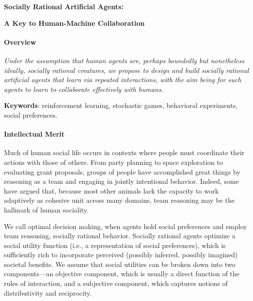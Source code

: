 
\centerline{\Large \bf Socially Rational Artificial Agents:}

\vspace{\down}
\centerline{\large \bf A Key to Human-Machine Collaboration}

\vspace{\up}
\paragraph{Overview}

\emph{Under the assumption that human agents are, perhaps boundedly
  but nonetheless ideally, socially rational creatures, we propose to
  design and build socially rational artificial agents that learn via
  repeated interactions, with the aim being for such agents to learn
  to collaborate effectively with humans.}



{\bf Keywords}: reinforcement learning, stochastic games, behavioral experiments, social preferences.

\vspace{\up}
\paragraph{Intellectual Merit}

Much of human social life occurs in contexts where people must
coordinate their actions with those of others.  From party planning to
space exploration to evaluating grant proposals, groups of people have
accomplished great things by reasoning as a team and engaging in
jointly intentional behavior.  Indeed, some have argued that, because
most other animals lack the capacity to work adaptively as cohesive
unit across many domains, team reasoning may be the hallmark of human
sociality.

We call optimal decision making, when agents hold social preferences
and employ team reasoning, socially rational behavior.  Socially
rational agents optimize a social utility function (i.e., a
representation of social preferences), which is sufficiently rich to
incorporate perceived (possibly inferred, possibly imagined) societal
benefits.  We assume that social utilities can be broken down into two
components---an objective component, which is usually a direct
function of the rules of interaction, and a subjective component,
which captures notions of distributivity and reciprocity.

